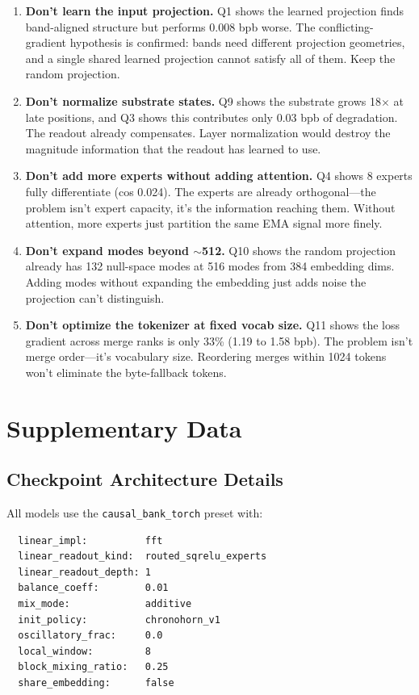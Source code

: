 \documentclass[11pt,a4paper]{report}
\begin{document}
\begin{enumerate}
\item \textbf{Don't learn the input projection.} Q1 shows the learned projection finds band-aligned structure but performs 0.008 bpb worse. The conflicting-gradient hypothesis is confirmed: bands need different projection geometries, and a single shared learned projection cannot satisfy all of them. Keep the random projection.

\item \textbf{Don't normalize substrate states.} Q9 shows the substrate grows 18$\times$ at late positions, and Q3 shows this contributes only 0.03 bpb of degradation. The readout already compensates. Layer normalization would destroy the magnitude information that the readout has learned to use.

\item \textbf{Don't add more experts without adding attention.} Q4 shows 8 experts fully differentiate (cos 0.024). The experts are already orthogonal---the problem isn't expert capacity, it's the information reaching them. Without attention, more experts just partition the same EMA signal more finely.

\item \textbf{Don't expand modes beyond $\sim$512.} Q10 shows the random projection already has 132 null-space modes at 516 modes from 384 embedding dims. Adding modes without expanding the embedding just adds noise the projection can't distinguish.

\item \textbf{Don't optimize the tokenizer at fixed vocab size.} Q11 shows the loss gradient across merge ranks is only 33\% (1.19 to 1.58 bpb). The problem isn't merge order---it's vocabulary size. Reordering merges within 1024 tokens won't eliminate the byte-fallback tokens.
\end{enumerate}


\chapter{Supplementary Data}

\section{Checkpoint Architecture Details}

All models use the \texttt{causal\_bank\_torch} preset with:

\begin{verbatim}
  linear_impl:          fft
  linear_readout_kind:  routed_sqrelu_experts
  linear_readout_depth: 1
  balance_coeff:        0.01
  mix_mode:             additive
  init_policy:          chronohorn_v1
  oscillatory_frac:     0.0
  local_window:         8
  block_mixing_ratio:   0.25
  share_embedding:      false
\end{verbatim}
\end{document}
